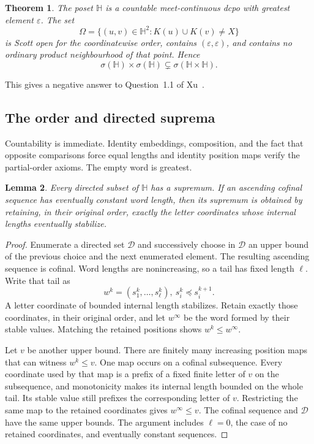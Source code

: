 \documentclass[10pt,a4paper]{article}
\newtheorem{theorem}{Theorem}[section]
\newtheorem{lemma}[theorem]{Lemma}
\theoremstyle{definition}
\newcommand{\HH}{\mathbb H}
\begin{document}
\begin{theorem}\label{word:thm:main}
The poset $\HH$ is a countable meet-continuous dcpo with greatest element $\varepsilon$. The set
\begin{equation}\label{word:eq:Omega}
 \Omega=\{(u,v)\in\HH^2:K(u)\cup K(v)\neq X\}
\end{equation}
is Scott open for the coordinatewise order, contains $(\varepsilon,\varepsilon)$, and contains no ordinary product neighbourhood of that point. Hence
\[
 \sigma(\HH)\times\sigma(\HH)
 \subsetneq
 \sigma(\HH\times\HH).
\]
\end{theorem}
This gives a negative answer to Question~1.1 of Xu~\cite{Xu}.

\subsection{The order and directed suprema}
Countability is immediate. Identity embeddings, composition, and the fact that opposite comparisons force equal lengths and identity position maps verify the partial-order axioms. The empty word is greatest.

\begin{lemma}\label{word:lem:sup}
Every directed subset of $\HH$ has a supremum. If an ascending cofinal sequence has eventually constant word length, then its supremum is obtained by retaining, in their original order, exactly the letter coordinates whose internal lengths eventually stabilize.
\end{lemma}
\begin{proof}
Enumerate a directed set $\mathcal D$ and successively choose in $\mathcal D$ an upper bound of the previous choice and the next enumerated element. The resulting ascending sequence is cofinal. Word lengths are nonincreasing, so a tail has fixed length $\ell$. Write that tail as
\[
 w^k=(s_1^k,\ldots,s_\ell^k),
 ~
 s_i^k\preceq s_i^{k+1}.
\]
A letter coordinate of bounded internal length stabilizes. Retain exactly those coordinates, in their original order, and let $w^\infty$ be the word formed by their stable values. Matching the retained positions shows $w^k\leq w^\infty$.

Let $v$ be another upper bound. There are finitely many increasing position maps that can witness $w^k\leq v$. One map occurs on a cofinal subsequence. Every coordinate used by that map is a prefix of a fixed finite letter of $v$ on the subsequence, and monotonicity makes its internal length bounded on the whole tail. Its stable value still prefixes the corresponding letter of $v$. Restricting the same map to the retained coordinates gives $w^\infty\leq v$. The cofinal sequence and $\mathcal D$ have the same upper bounds. The argument includes $\ell=0$, the case of no retained coordinates, and eventually constant sequences.
\end{proof}
\end{document}
